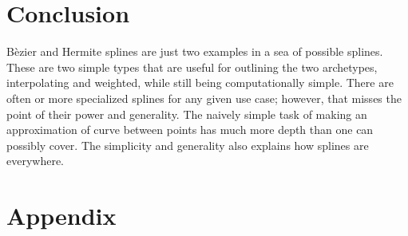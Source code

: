 \documentclass[12pt, letterpaper]{article}
\begin{document}
\section{Conclusion}
B\`ezier and Hermite splines are just two examples in a sea of possible splines. These are two simple types
that are useful for outlining the two archetypes, interpolating and weighted, while still being
computationally simple. There are often  or more specialized splines for any given use case;
however, that misses the point of their power and generality. The naively simple task of making an
approximation of curve between points has much more depth than one can possibly cover. The simplicity and
generality also explains how splines are everywhere.

\newpage


\newpage
\section{Appendix}

\newpage

\end{document}
